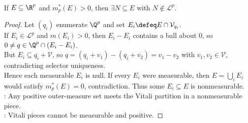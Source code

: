 \begin{theorem} \label{thm:positive-outer-measure-contains-nonmeasurable-subset} \\
If $E\subseteq\R^p$ and $m_p^\ast(E)>0$, then $\exists N\subseteq E$ with $N\notin\mathcal{L}^p$.
\begin{proof} Let $(q_i)$ enumerate $\Q^p$ and set $E_i\defeq E\cap\mathcal{V}_{q_i}$.\\
If $E_i\in\mathcal{L}^p$ and $m(E_i)>0$, then $E_i-E_i$ contains a ball about $0$, so $0\neq q\in\Q^p\cap(E_i-E_i)$.\\
But $E_i\subseteq q_i+\mathcal{V}$, so $q=(q_i+v_1)-(q_i+v_2)=v_1-v_2$ with $v_1,v_2\in\mathcal{V}$, contradicting selector uniqueness.\\
Hence each measurable $E_i$ is null. If every $E_i$ were measurable, then $E=\bigcup_iE_i$ would satisfy $m_p^\ast(E)=0$, contradiction. Thus some $E_i\subseteq E$ is nonmeasurable.\\
: Any positive outer-measure set meets the Vitali partition in a nonmeasurable piece.\\
: Vitali pieces cannot be measurable and positive.
\end{proof}
\end{theorem}


